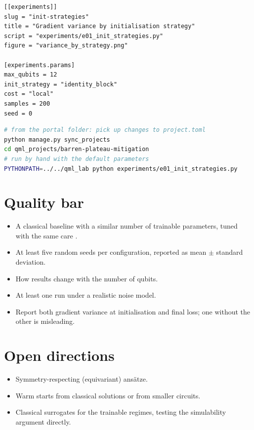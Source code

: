 \documentclass[11pt,a4paper]{article}
\begin{document}
\begin{lstlisting}[language={}]
[[experiments]]
slug = "init-strategies"
title = "Gradient variance by initialisation strategy"
script = "experiments/e01_init_strategies.py"
figure = "variance_by_strategy.png"

[experiments.params]
max_qubits = 12
init_strategy = "identity_block"
cost = "local"
samples = 200
seed = 0
\end{lstlisting}

\begin{lstlisting}[language=bash]
# from the portal folder: pick up changes to project.toml
python manage.py sync_projects
cd qml_projects/barren-plateau-mitigation
# run by hand with the default parameters
PYTHONPATH=../../qml_lab python experiments/e01_init_strategies.py
\end{lstlisting}

\section{Quality bar}
\begin{itemize}
  \item A classical baseline with a similar number of trainable parameters, tuned with the same care \citep{bowles2024}.
  \item At least five random seeds per configuration, reported as mean $\pm$ standard deviation.
  \item How results change with the number of qubits.
  \item At least one run under a realistic noise model.
  \item Report both gradient variance at initialisation and final loss; one without the other is misleading.
\end{itemize}

\section{Open directions}
\begin{itemize}
  \item Symmetry-respecting (equivariant) ans\"atze.
  \item Warm starts from classical solutions or from smaller circuits.
  \item Classical surrogates for the trainable regimes, testing the simulability argument directly.
\end{itemize}
\end{document}
